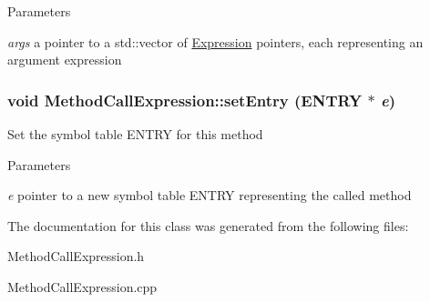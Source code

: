 \begin{DoxyParams}{Parameters}
\item[{\em args}]a pointer to a std::vector of \hyperlink{classExpression}{Expression} pointers, each representing an argument expression \end{DoxyParams}
\hypertarget{classMethodCallExpression_a573fa44f50e5c3c55e0801d726ccf594}{
\subsubsection[{setEntry}]{\setlength{\rightskip}{0pt plus 5cm}void MethodCallExpression::setEntry (ENTRY $\ast$ {\em e})}}
\label{classMethodCallExpression_a573fa44f50e5c3c55e0801d726ccf594}
Set the symbol table ENTRY for this method


\begin{DoxyParams}{Parameters}
\item[{\em e}]pointer to a new symbol table ENTRY representing the called method \end{DoxyParams}


The documentation for this class was generated from the following files:\begin{DoxyCompactItemize}
\item 
MethodCallExpression.h\item 
MethodCallExpression.cpp\end{DoxyCompactItemize}

